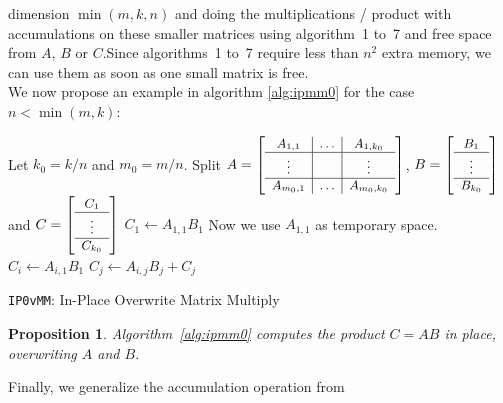 \documentclass{article}
\newtheorem{prop}{Proposition}
\begin{document}
dimension $\min{(m,k,n)}$ and doing the multiplications / product with accumulations on
these smaller matrices using
algorithm~1 to~7 and free space from $A$, $B$ or $C$.Since algorithms~1 to~7 require less than $n^2$ extra memory, we can use them as soon as one small matrix is free.\\
We now propose an example in algorithm \ref{alg:ipmm0} for the case $n < \min{(m,k)}$:
\begin{algorithm}[htb] \begin{algorithmic}[1]
\State Let $k_0 = k/n$ and $m_0 = m/n$.
		\State Split $A = \left[ \small
		\begin{array}{c|c|c} 
			A_{1,1} & \dots & A_{1,k_0}\\
			\hline
			\vdots & & \vdots \\
			\hline
			A_{m_0,1} & \dots & A_{m_0,k_0}\\
		\end{array}\right]$, $B  = \left[ \small
		\begin{array}{c} 
			B_{1} \\ 
			\hline  \vdots  \\ 
			\hline B_{k_0} 
		\end{array}\right]$ and $C  = \left[ \small
		\begin{array}{c} 
			C_{1} \\ 
			\hline  \vdots  \\ 
			\hline C_{k_0} 
		\end{array}\right]$
		\State $C_{1} \gets A_{1,1}B_{1}$ 
		\State Now we use  $A_{1,1}$ as temporary space.
		\State $C_{i} \gets A_{i,1}B_{1}$  
		\EndFor
		\State $C_j \gets  A_{i,j}B_{j} + C_j$ 
		\EndFor
		\EndFor
\end{algorithmic}
	\caption{\texttt{IP0vMM}: In-Place Overwrite Matrix Multiply}\label{alg:ipmm0}
\end{algorithm}\begin{prop}
	Algorithm~\ref{alg:ipmm0} computes the product $C = A B$ in place, overwriting $A$ and $B$.
\end{prop}Finally, we generalize the accumulation operation from
\end{document}
